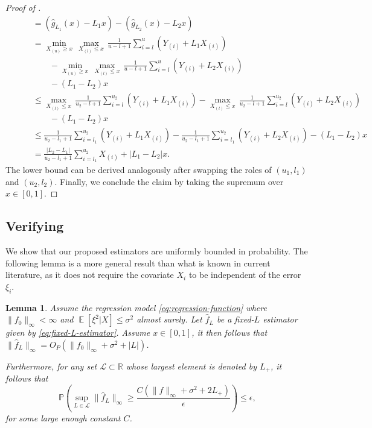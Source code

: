 \documentclass[12pt]{article}
\DeclareMathOperator*{\E}{\mathbb{E}}
\newtheorem{lemma}[theorem]{Lemma}
\begin{document}
\begin{appendices}
\begin{proof}[Proof of ]
\begin{align*}
       &\qquad = (\widehat{g}_{L_1}(x) - L_1 x) - (\widehat{g}_{L_2}(x) - L_2 x) \\
        &\qquad = \min_{X_{(u)} \ge x} \, \max_{X_{(l)} \le x} \, \frac{1}{u-l+1}\sum_{i = l}^u (Y_{(i)}+L_1X_{(i)}) \\
        &\qquad\qquad- \min_{X_{(u)} \ge x} \, \max_{X_{(l)} \le x} \, \frac{1}{u-l+1}\sum_{i = l}^{u} (Y_{(i)}+L_2X_{(i)}) \\
        &\qquad\qquad-(L_1-L_2)x \\
        &\qquad \le \max_{X_{(l)} \le x} \, \frac{1}{u_2-l+1}\sum_{i = l}^{u_2} (Y_{(i)}+L_1X_{(i)}) - \max_{X_{(l)} \le x} \, \frac{1}{u_2-l+1}\sum_{i = l}^{u_2} (Y_{(i)}+L_2X_{(i)}) \\
        &\qquad\qquad- (L_1-L_2)x\\
        &\qquad \le \frac{1}{u_2-l_1+1}\sum_{i = l_1}^{u_2} (Y_{(i)}+L_1X_{(i)}) - \frac{1}{u_2-l_1+1}\sum_{i = l_1}^{u_2} (Y_{(i)}+L_2X_{(i)}) - (L_1-L_2)x \\
        &\qquad = \frac{|L_2-L_1|}{u_2-l_1+1}\sum_{i = l_1}^{u_2} X_{(i)}+ |L_1-L_2|x.
    \end{align*}
    The lower bound can be derived analogously after swapping the roles of $(u_1, l_1)$ and $(u_2, l_2)$. Finally, we conclude the claim by taking the supremum over $x \in [0,1]$.
\end{proof}
\subsection{Verifying }\label{supp:boundedness}
We show that our proposed estimators are uniformly bounded in probability. The following lemma is a more general result than what is known in current literature, as it does not require the covariate $X_i$ to be independent of the error $\xi_i$.

\begin{lemma}\label{lemma:boundedness_estimator}
Assume the regression model \eqref{eq:regression-function} where $\|f_0\|_\infty < \infty$ and $\E[\xi^2|X] \leq \sigma^2$ almost surely. Let $\widehat{f}_{L}$ be a fixed-$L$ estimator given by \eqref{eq:fixed-L-estimator}. Assume $x\in[0,1]$, it then follows that $\|\widehat f_{L}\|_\infty = O_P(\|f_0\|_\infty + \sigma^2 + |L|)$. 

Furthermore, for any set $\mathcal{L} \subset \mathbb{R}$ whose largest element is denoted by $L_+$, it follows that 
\begin{equation}
\mathbb{P}\left(\sup _{L \in \mathcal{L}}\|\widehat{f}_L\|_{\infty} \geq \frac{C\left(\|f\|_{\infty}+\sigma^2+2 L_{+}\right)}{\epsilon}\right) \leq \epsilon,
\end{equation}
for some large enough constant $C$.
\end{lemma}


\end{appendices}
\end{document}

